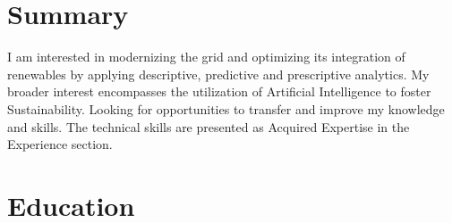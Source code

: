 \documentclass[11pt,letterpaper,sans]{moderncv}
\begin{document}
\makecvtitle
\vspace{-2ex}
\section{Summary}
I am interested in modernizing the grid and optimizing its integration of renewables by applying descriptive, predictive and prescriptive analytics. 
My broader interest encompasses the utilization of Artificial Intelligence to foster Sustainability. Looking for opportunities to transfer and improve my knowledge and skills.
The technical skills are presented as Acquired Expertise in the Experience section.


\section{Education}


\end{document}
